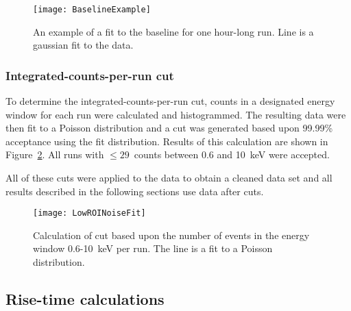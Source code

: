 				\begin{figure}
					\centering
					\texttt{[image: BaselineExample]}
					\caption[An example of a fit to the baseline for one hour-long run]
					{An example of a fit to the baseline for one hour-long run.  Line is a gaussian fit to the data.}
					\label{fig:PPC2BaselineCuts}
				\end{figure}
				
			\subsubsection{Integrated-counts-per-run cut}
	To determine the integrated-counts-per-run cut, counts in a designated energy window for each run were calculated and histogrammed.  The resulting data were then fit to a Poisson distribution and a cut was generated based upon 99.99\% acceptance using the fit distribution.  Results of this calculation are shown in Figure~\ref{fig:PPC2NoiseCuts}.  All runs with $\leq29$~counts between 0.6 and 10~keV were accepted.  
	
	All of these cuts were applied to the data to obtain a cleaned data set and all results described in the following sections use data after cuts.
	
				\begin{figure}
					\centering
					\texttt{[image: LowROINoiseFit]}
					\caption[Calculation of noise cuts]
					{Calculation of cut based upon the number of events in the energy window 0.6-10~keV per run.  
					The line is a fit to a Poisson distribution.  }
					\label{fig:PPC2NoiseCuts}
				\end{figure}
	
	    	\subsection{Rise-time calculations}
		\label{sec:DeploymentPPC2SoudanAnalysisRisetime}    
	
